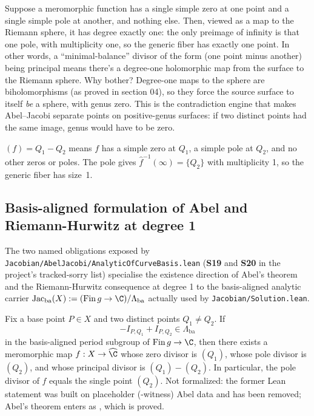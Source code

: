 \begin{layman}
Suppose a meromorphic function has a single simple zero at one point
and a single simple pole at another, and nothing else. Then, viewed as
a map to the Riemann sphere, it has degree exactly one: the only
preimage of infinity is that one pole, with multiplicity one, so the
generic fiber has exactly one point. In other words, a
``minimal-balance'' divisor of the form (one point minus another) being
principal means there's a degree-one holomorphic map from the surface
to the Riemann sphere. Why bother? Degree-one maps to the sphere are
biholomorphisms (as proved in section 04), so they force the source
surface to itself \emph{be} a sphere, with genus zero. This is the
contradiction engine that makes Abel--Jacobi separate points on
positive-genus surfaces: if two distinct points had the same image,
genus would have to be zero.
\end{layman}

\begin{proofsketch}
\((f)=Q_1-Q_2\) means \(f\) has a simple zero at \(Q_1\), a simple pole
at \(Q_2\), and no other zeros or poles. The pole gives \(\widehat
f^{-1}(\infty)=\{Q_2\}\) with multiplicity 1, so the generic fiber has
size~1.
\end{proofsketch}



\subsection{Basis-aligned formulation of Abel and Riemann-Hurwitz at
degree 1}

The two named obligations exposed by
\texttt{Jacobian/AbelJacobi/AnalyticOfCurveBasis.lean}
(\textbf{S19} and \textbf{S20} in the project's tracked-sorry list)
specialise the existence direction of Abel's theorem and the
Riemann-Hurwitz consequence at degree 1 to the basis-aligned
analytic carrier
\(\mathrm{Jac}_{\mathrm{ba}}(X) := (\mathrm{Fin}\,g \to \C) /
\Lambda_{\mathrm{ba}}\)
actually used by \texttt{Jacobian/Solution.lean}.

\begin{theorem}
\label{thm:abel-basis-aligned-two-point}
Fix a base point \(P\in X\) and two distinct points
\(Q_1\neq Q_2\). If
\[
   -I_{P,Q_1} + I_{P,Q_2} \in \Lambda_{\mathrm{ba}}
\]
in the basis-aligned period subgroup of \(\mathrm{Fin}\,g \to \C\),
then there exists a meromorphic map \(f : X \to \widehat{\C}\) whose
zero divisor is \((Q_1)\), whose pole divisor is \((Q_2)\), and whose
principal divisor is \((Q_1) - (Q_2)\). In particular, the pole
divisor of \(f\) equals the single point \((Q_2)\).
Not formalized: the former Lean statement was built on placeholder
(-witness) Abel data and has been removed; Abel's theorem
enters as , which is proved.
\end{theorem}

